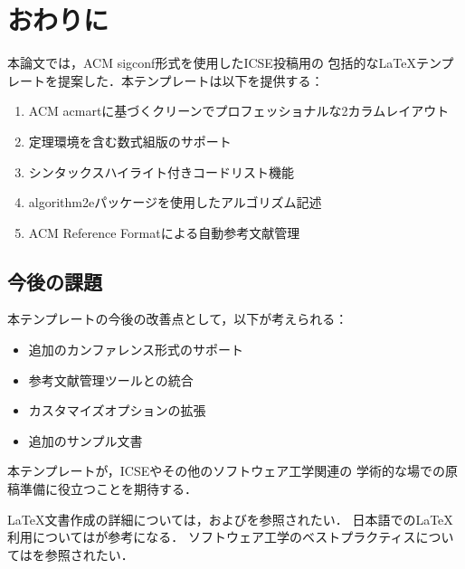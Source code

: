 
\section{おわりに}
\label{sec:conclusion}

本論文では，ACM sigconf形式を使用したICSE投稿用の
包括的なLaTeXテンプレートを提案した．本テンプレートは以下を提供する：

\begin{enumerate}
    \item ACM acmartに基づくクリーンでプロフェッショナルな2カラムレイアウト
    \item 定理環境を含む数式組版のサポート
    \item シンタックスハイライト付きコードリスト機能
    \item algorithm2eパッケージを使用したアルゴリズム記述
    \item ACM Reference Formatによる自動参考文献管理
\end{enumerate}

\subsection{今後の課題}

本テンプレートの今後の改善点として，以下が考えられる：

\begin{itemize}
    \item 追加のカンファレンス形式のサポート
    \item 参考文献管理ツールとの統合
    \item カスタマイズオプションの拡張
    \item 追加のサンプル文書
\end{itemize}

本テンプレートが，ICSEやその他のソフトウェア工学関連の
学術的な場での原稿準備に役立つことを期待する．

LaTeX文書作成の詳細については，\cite{lamport1994latex}および\cite{knuth1984texbook}を参照されたい．
日本語でのLaTeX利用については\cite{okumura2020latex}が参考になる．
ソフトウェア工学のベストプラクティスについては\cite{softwareeng}を参照されたい．
